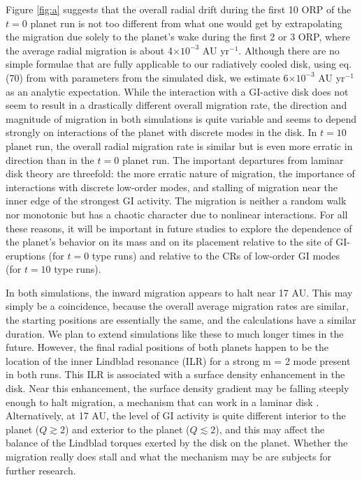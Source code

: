 \documentclass[12pt,manuscript,authoryear]{aastex}
\begin{document}
Figure \ref{fig:a} suggests that the overall radial drift during the first 10 ORP of the $t = 0$ planet run is not too
different from what one would get by extrapolating the migration due solely to the planet's wake during the first 2 or 3
ORP, where the average radial migration is about 4$\times10^{-3}$ AU yr$^{-1}$. Although there are no simple formulae
that are fully applicable to our radiatively cooled disk, using eq. (70) from \citet{tanaka2002} with parameters from
the simulated disk, we estimate 6$\times10^{-3}$ AU yr$^{-1}$ as an analytic expectation. While the interaction with a
GI-active disk does not seem to result in a drastically different overall migration rate, the direction and magnitude of
migration in both simulations is quite variable and seems to depend strongly on interactions of the planet with discrete
modes in the disk. In $t = 10$ planet run, the overall radial migration rate is similar but is even more erratic in
direction than in the $t = 0$ planet run. The important departures from laminar disk theory are threefold: the more
erratic nature of migration, the importance of interactions with discrete low-order modes, and stalling of migration
near the inner edge of the strongest GI activity. The migration is neither a random walk nor monotonic but has a chaotic
character due to nonlinear interactions. For all these reasons, it will be important in future studies to explore the
dependence of the planet's behavior on its mass and on its placement relative to the site of GI-eruptions (for $t = 0$
type runs) and relative to the CRs of low-order GI modes (for $t = 10$ type runs).

In both simulations, the inward migration appears to halt near 17 AU. This may simply be a coincidence, because the
overall average migration rates are similar, the starting positions are essentially the same, and the calculations have
a similar duration. We plan to extend simulations like these to much longer times in the future. However, the final
radial positions of both planets happen to be the location of the inner Lindblad resonance (ILR) for a strong m = 2 mode
present in both runs. This ILR is associated with a surface density enhancement in the disk. Near this enhancement, the
surface density gradient may be falling steeply enough to halt migration, a mechanism that can work in a laminar disk
\citep{paardekooper2009}.  Alternatively, at 17 AU, the level of GI activity is quite different interior to the planet
($Q \gtrsim 2$) and exterior to the planet ($Q \lesssim 2$), and this may affect the balance of the Lindblad torques
exerted by the disk on the planet. Whether the migration really does stall and what the mechanism may be are subjects
for further research.
\end{document}
